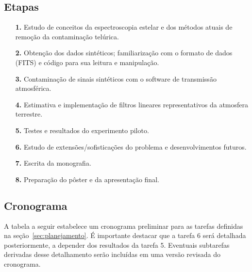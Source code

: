 \documentclass[11pt,twoside,a4paper]{article}
\begin{document}
\subsection{Etapas}
\begin{itemize}
    \item [\textbf{1.}] Estudo de conceitos da espectroscopia estelar e dos métodos atuais de remoção da contaminação telúrica.
    \item [\textbf{2.}] Obtenção dos dados sintéticos; familiarização com o formato de dados (FITS) e código para sua leitura e manipulação.
    \item [\textbf{3.}] Contaminação de sinais sintéticos com o software de transmissão atmosférica.
    \item [\textbf{4.}] Estimativa e implementação de filtros lineares representativos da atmosfera terrestre.
    \item [\textbf{5.}] Testes e resultados do experimento piloto.
    \item [\textbf{6.}] Estudo de extensões/sofisticações do problema e desenvolvimentos futuros.
    \item [\textbf{7.}] Escrita da monografia.
    \item [\textbf{8.}] Preparação do pôster e da apresentação final.
\end{itemize}

\subsection{Cronograma}

A tabela a seguir estabelece um cronograma preliminar para as tarefas definidas na seção~\ref{sec:planejamento}. É importante destacar que a tarefa 6 será detalhada posteriormente, a depender dos resultados da tarefa 5. Eventuais subtarefas derivadas desse detalhamento serão incluídas em uma versão revisada do cronograma.
\end{document}
